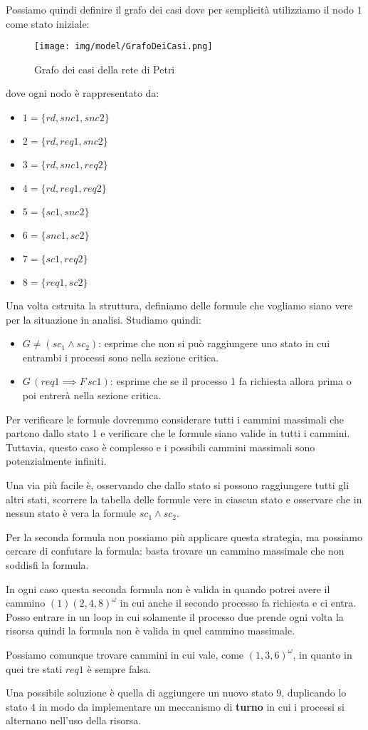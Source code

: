 \begin{esempio}
    Possiamo quindi definire il grafo dei casi dove per semplicità utilizziamo il
    nodo $1$ come stato iniziale:
    \begin{figure}[!ht]
        \centering
        \texttt{[image: img/model/GrafoDeiCasi.png]}
        \caption{Grafo dei casi della rete di Petri}
    \end{figure}
    dove ogni nodo è rappresentato da:
    \begin{itemize}
        \item $1=\{rd,snc1,snc2\}$
        \item $2=\{rd,req1,snc2\}$
        \item $3=\{rd,snc1,req2\}$
        \item $4=\{rd,req1,req2\}$
        \item $5=\{sc1, snc2\}$
        \item $6=\{snc1,sc2\}$
        \item $7=\{sc1, req 2\}$
        \item $8=\{req1,sc2\}$
    \end{itemize}
    Una volta cstruita la struttura, definiamo delle formule che vogliamo siano
    vere per la situazione in analisi. Studiamo quindi:
    \begin{itemize}
        \item $G\neq (sc_1\land sc_2)$: esprime che non si può raggiungere
              uno stato in cui entrambi i processi sono nella sezione critica.
        \item $G\,(req1\implies F\,sc1)$: esprime che se il processo 1 fa richiesta
              allora prima o poi entrerà nella sezione critica.
    \end{itemize}
    Per verificare le formule dovremmo considerare tutti i cammini massimali che
    partono dallo stato 1 e verificare che le formule siano valide in tutti i
    cammini. Tuttavia, questo caso è complesso e i possibili cammini massimali
    sono potenzialmente infiniti.

    Una via più facile è, osservando che dallo stato si possono raggiungere tutti
    gli altri stati, scorrere la tabella delle formule vere in ciascun stato e
    osservare che in nessun stato è vera la formule $sc_1 \land sc_2$.

    Per la seconda formula non possiamo più applicare questa strategia, ma possiamo
    cercare di confutare la formula: basta trovare un cammino massimale che non
    soddisfi la formula.

    In ogni caso questa seconda formula non è valida in quando potrei avere il
    cammino $(1)(2,4,8)^\omega$ in cui anche il secondo processo fa richiesta e
    ci entra. Posso entrare in un loop in cui solamente il processo due prende
    ogni volta la risorsa quindi la formula non è valida in quel cammino massimale.

    Possiamo comunque trovare cammini in cui vale, come $(1,3,6)^\omega$, in
    quanto in quei tre stati $req1$ è sempre falsa.

    Una possibile soluzione è quella di aggiungere un nuovo stato $9$, duplicando
    lo stato $4$ in modo da implementare un meccanismo di \textbf{turno} in cui
    i processi si alternano nell'uso della risorsa.
\end{esempio}
